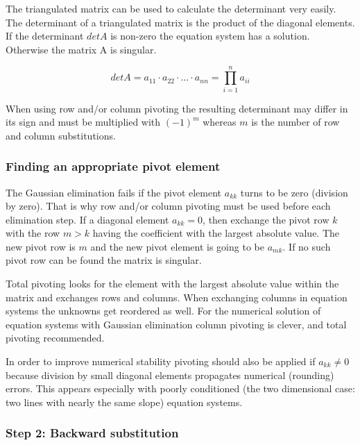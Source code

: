 The triangulated matrix can be used to calculate the determinant very
easily.  The determinant of a triangulated matrix is the product of
the diagonal elements.  If the determinant $det A$ is non-zero the
equation system has a solution.  Otherwise the matrix A is singular.

\begin{equation}
det A = a_{11}\cdot a_{22}\cdot \ldots \cdot a_{nn} = \prod_{i=1}^{n} a_{ii}
\end{equation}

When using row and/or column pivoting the resulting determinant may
differ in its sign and must be multiplied with $(-1)^m$ whereas $m$ is
the number of row and column substitutions.

\subsubsection{Finding an appropriate pivot element}

The Gaussian elimination fails if the pivot element $a_{kk}$ turns to
be zero (division by zero).  That is why row and/or column pivoting
must be used before each elimination step.  If a diagonal element
$a_{kk} = 0$, then exchange the pivot row $k$ with the row $m > k$
having the coefficient with the largest absolute value.  The new pivot
row is $m$ and the new pivot element is going to be $a_{mk}$.  If no
such pivot row can be found the matrix is singular.

\addvspace{12pt}

Total pivoting looks for the element with the largest absolute value
within the matrix and exchanges rows and columns.  When exchanging
columns in equation systems the unknowns get reordered as well.  For
the numerical solution of equation systems with Gaussian elimination
column pivoting is clever, and total pivoting recommended.

\addvspace{12pt}

In order to improve numerical stability pivoting should also be
applied if $a_{kk} \ne 0$ because division by small diagonal elements
propagates numerical (rounding) errors.  This appears especially with
poorly conditioned (the two dimensional case: two lines with nearly
the same slope) equation systems.

\subsubsection{Step 2: Backward substitution}

